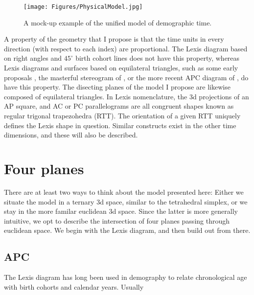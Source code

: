 \documentclass[onehalfspacing]{article}
\begin{document}
\begin{figure}[!h]
\centering
\caption[cap]{A mock-up example of the unified model of demographic
time.\footnotemark}
\label{fig:APCT}
	\texttt{[image: Figures/PhysicalModel.jpg]}
\end{figure}

A property of the geometry that I propose is that
the time units in every direction (with respect to each index) are proportional. The Lexis
diagram based on right angles and $45^\circ$ birth cohort lines does not have
this property, whereas Lexis diagrams and surfaces based on equilateral
triangles, such as some early proposals \citep[inter
alia, ][]{lexis1875einleitung, lewin1876rapport}, the masterful stereogram of
\citet{perozzo1880della}, or the more recent APC diagram
of \citet{ryder1980cohort}, do have this property. The disecting planes of the
model I propose are likewise composed of equilateral triangles. In Lexis
nomenclature, the 3d projections of an AP square, and AC or PC
parallelograms are all congruent shapes known as regular trigonal trapezohedra
(RTT). The orientation
of a given RTT uniquely defines the Lexis shape in question. Similar constructs
exist in the other time dimensions, and these will also be described. 

\section*{Four planes}

There are at least two ways to think about the model presented here: Either we
situate the model in a ternary 3d space, similar to the tetrahedral simplex, or
we stay in the more familar euclidean 3d space. Since the latter is more
generally intuitive, we opt to describe the intersection of four planes passing
through euclidean space. We begin with the Lexis diagram, and then build out
from there.

\subsection{APC}
The Lexis diagram has long been used in demography to relate chronological age
with birth cohorts and calendar years. Usually







   
\end{document}
